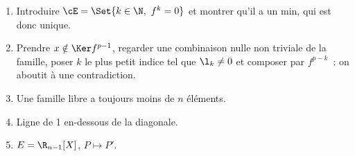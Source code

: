 \begin{enumerate}
\item Introduire $\cE=\Set{k\in\N,\ f^k=0}$ et montrer qu'il a un min, qui est donc unique.
\item Prendre $x\notin\Ker f^{p-1}$, regarder une combinaison nulle non triviale de la famille, poser $k$ le plus petit indice tel que $\l_k\neq 0$ et composer par $f^{p-k}$~: on aboutit à une contradiction.
\item Une famille libre a toujours moins de $n$ éléments.
\item Ligne de 1 en-dessous de la diagonale.
\item $E=\R_{n-1}[X]$, $P\mapsto P'$.
\end{enumerate}
